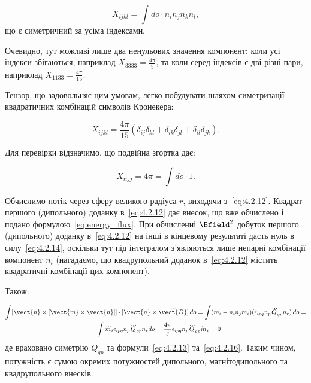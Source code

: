 \begin{equation}
X_{ijkl} = \int do \cdot n_i n_j n_k n_l,
\label{eq:tensor_X}
\end{equation}
%
що є симетричний за усіма індексами.

Очевидно, тут можливі лише два ненульових значення компонент: коли усі індекси збігаються, наприклад \( X_{3333} =
\frac{4\pi}{5} \), та коли серед індексів є дві різні пари, наприклад \( X_{1133} = \frac{4\pi}{15} \).

Тензор, що задовольняє цим умовам, легко побудувати шляхом симетризації квадратичних комбінацій символів Кронекера:

\begin{equation}\label{eq:4.2.16}
X_{ijkl} = \frac{4\pi}{15} (\delta_{ij}\delta_{kl} + \delta_{ik}\delta_{jl} + \delta_{il}\delta_{jk}).
\end{equation}

Для перевірки відзначимо, що подвійна згортка дає:

\begin{equation*}
X_{iijj} = 4\pi = \int do \cdot 1.
\end{equation*}

Обчислимо потік через сферу великого радіуса \( r \), виходячи з~\eqref{eq:4.2.12}. Квадрат першого (дипольного) доданку
в~\eqref{eq:4.2.12} дає внесок, що вже обчислено і подано формулою~\eqref{eq:energy_flux}. При обчисленні \( \Bfield^2
\) добуток першого (дипольного) доданку в~\eqref{eq:4.2.12} на інші в кінцевому результаті дасть нуль в
силу~\eqref{eq:4.2.14}, оскільки тут під інтегралом з'являються лише непарні комбінації компонент \( n_i \) (нагадаємо,
що квадрупольний доданок в~\eqref{eq:4.2.12} містить квадратичні комбінації цих компонент).

Також:

\begin{multline*}
\int [\vect{n} \times [\ddot{\vect{m}}\times\vect{n}]] \cdot [\vect{n} \times \dddot{\vect{D}}] \, do = \int (m_i - n_i n_j m_i)
(\epsilon_{ipq} n_p \dddot{Q}_{qr} n_r) \, do = \\ = \int \dddot{m}_i\epsilon_{ipq} n_p \dddot{Q}_{qr} n_r do =
\frac{4\pi}c \epsilon_{ipq} n_p \dddot{Q}_{qp}\dddot{m}_i = 0
\end{multline*}
%
де враховано симетрію \( Q_{qp} \) та формули~\eqref{eq:4.2.13} та~\eqref{eq:4.2.16}. Таким чином, потужність є сумою
окремих потужностей дипольного, магнітодипольного та квадрупольного внесків.

